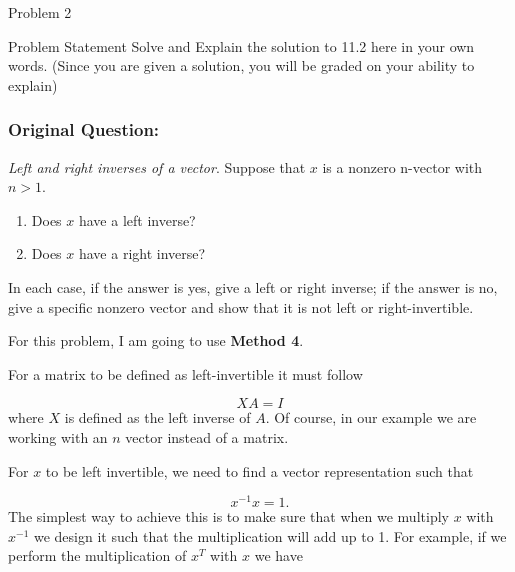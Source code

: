 \begin{problem}{Problem 2}
    \begin{statement}{Problem Statement}
        Solve and Explain the solution to 11.2 here in your own words. (Since you are given a solution, you will be graded on your ability to explain)

        \subsubsection*{Original Question:}

        \textit{Left and right inverses of a vector}. Suppose that $x$ is a nonzero n-vector with $n > 1$.

        \begin{enumerate}[label = (\alph*)]
            \item Does $x$ have a left inverse?
            \item Does $x$ have a right inverse?
        \end{enumerate}
        In each case, if the answer is yes, give a left or right inverse; if the answer is no, give a specific nonzero vector and show that it is not left or right-invertible.
    \end{statement}

    \begin{Highlight}
        \noindent For this problem, I am going to use \textbf{Method 4}. \vspace*{1em}

        For a matrix to be defined as left-invertible it must follow 

        \setcounter{equation}{0}
        \begin{equation}
            XA = I
        \end{equation}
        where $X$ is defined as the left inverse of $A$. Of course, in our example we are working with an $n$ vector instead of a matrix. 

        For $x$ to be left invertible, we need to find a vector representation such that

        \begin{equation}
            x^{-1}x = 1.
        \end{equation}
        The simplest way to achieve this is to make sure that when we multiply $x$ with $x^{-1}$ we design it such that the multiplication will add up to 1. For example, if we perform the multiplication 
        of $x^{T}$ with $x$ we have


\end{Highlight}
\end{problem}
